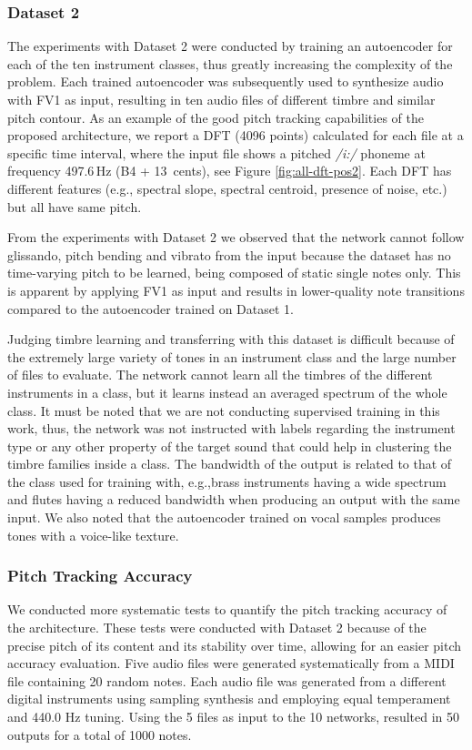 \subsubsection{Dataset 2}

The experiments with Dataset 2 were conducted by training an autoencoder for each of the ten instrument classes, thus greatly increasing the complexity of the problem. Each trained autoencoder was subsequently used to synthesize audio with FV1 as input, resulting in ten audio files of different timbre and similar pitch contour. As an example of the good pitch tracking capabilities of the proposed architecture, we report a DFT (4096 points) calculated for each file at a specific time interval, where the input file shows a pitched \textit{/i:/} phoneme at frequency 497.6\,Hz (B4 + 13~cents), see Figure \ref{fig:all-dft-pos2}. Each DFT has different features (e.g., spectral slope, spectral centroid, presence of noise, etc.) but all have same pitch. 

From the experiments with Dataset 2 we observed that the network cannot follow glissando, pitch bending and vibrato from the input because the dataset has no time-varying pitch to be learned, being composed of static single notes only. This is apparent by applying FV1 as input and results in lower-quality note transitions compared to the autoencoder trained on Dataset 1. 

Judging timbre learning and transferring with this dataset is difficult because of the extremely large variety of tones in an instrument class and the large number of files to evaluate. The network cannot learn all the timbres of the different instruments in a class, but it learns instead an averaged spectrum of the whole class. It must be noted that we are not conducting supervised training in this work, thus, the network was not instructed with labels regarding the instrument type or any other property of the target sound that could help in clustering the timbre families inside a class.
The bandwidth of the output is related to that of the class used for training with, e.g.,brass instruments having a wide spectrum and flutes having a reduced bandwidth when producing an output with the same input. We also noted that the autoencoder trained on vocal samples produces tones with a voice-like texture. 


\subsubsection{Pitch Tracking Accuracy}
We conducted more systematic tests to quantify the pitch tracking accuracy of the architecture. These tests were conducted with Dataset 2 because of the precise pitch of its content and its stability over time, allowing for an easier pitch accuracy evaluation. Five audio files were generated systematically from a MIDI file containing 20 random notes. Each audio file was generated from a different digital instruments using sampling synthesis and employing equal temperament and 440.0 Hz tuning. Using the 5 files as input to the 10 networks, resulted in 50 outputs for a total of 1000 notes. 

